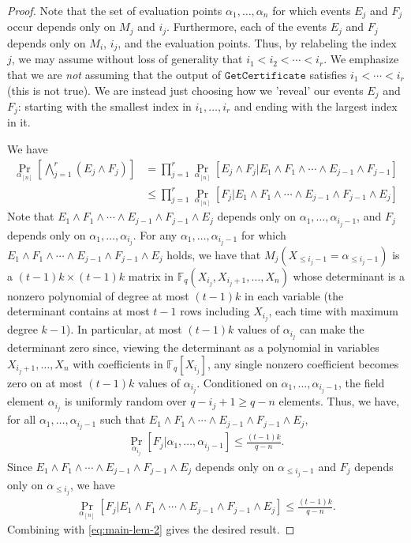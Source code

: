 \documentclass{article}[11pt]
\begin{document}
\begin{proof}
  Note that the set of evaluation points $\alpha_1,\dots,\alpha_n$ for which events $E_j$ and $F_j$ occur depends only on $M_j$ and $i_j$.
  Furthermore, each of the events $E_j$ and $F_j$ depends only on $M_i$, $i_j$, and the evaluation points.
  Thus, by relabeling the index $j$, we may assume without loss of generality that $i_1<i_2<\cdots<i_r$.
  We emphasize that we are \emph{not} assuming that the output of $\mathtt{GetCertificate}$ satisfies $i_1<\cdots<i_r$ (this is not true).
  We are instead just choosing how we 'reveal' our events $E_j$ and $F_j$: starting with the smallest index in $i_1, \ldots , i_r$ and ending with the largest index in it.

  We have
  \begin{align}
    \Pr_{\alpha_{[n]}}\left[\bigwedge_{j=1}^{r} (E_j\wedge F_j)\right]
    &=\prod_{j=1}^{r} \Pr_{\alpha_{[n]}}\left[E_j\wedge F_j|E_1\wedge F_1\wedge\cdots\wedge E_{j-1}\wedge F_{j-1}\right] \nonumber\\
    &\le\prod_{j=1}^{r} \Pr_{\alpha_{[n]}}\left[F_j|E_1\wedge F_1\wedge\cdots\wedge E_{j-1}\wedge F_{j-1}\wedge E_j\right] 
    \label{eq:main-lem-2}
  \end{align}
  Note that $E_1\wedge F_1\wedge \cdots \wedge E_{j-1}\wedge F_{j-1}\wedge E_j$ depends only on $\alpha_1,\dots,\alpha_{i_j-1}$, and $F_j$ depends only on $\alpha_1,\dots,\alpha_{i_j}$.
  For any $\alpha_1,\dots,\alpha_{i_j-1}$ for which $E_1\wedge F_1\wedge \cdots \wedge E_{j-1}\wedge F_{j-1}\wedge E_j$ holds, we have that $M_j(X_{\le i_j-1}= \alpha_{\le i_j-1})$ is a $(t-1)k\times (t-1)k$ matrix in $\mathbb{F}_q(X_{i_j},X_{i_j+1},\dots,X_n)$ whose determinant is a nonzero polynomial of degree at most $(t-1)k$ in each variable (the determinant contains at most $t-1$ rows including $X_{i_j}$, each time with maximum degree $k-1$). In particular, at most $(t-1)k$ values of $\alpha_{i_j}$ can make the determinant zero since, viewing the determinant as a polynomial in variables $X_{i_j+1},\dots,X_n$ with coefficients in $\mathbb{F}_q[X_{i_j}]$, any single nonzero coefficient becomes zero on at most $(t-1)k$ values of $\alpha_{i_j}$.
  Conditioned on $\alpha_1,\dots,\alpha_{i_j-1}$, the field element $\alpha_{i_j}$ is uniformly random over $q-i_j+1\ge q-n$ elements.
  Thus, we have, for all $\alpha_1,\dots,\alpha_{i_j-1}$ such that $E_1\wedge F_1\wedge \cdots \wedge E_{j-1}\wedge F_{j-1}\wedge E_j$,
  \begin{align}
    \Pr_{\alpha_{i_j}}\left[F_j|\alpha_1,\dots,\alpha_{i_j-1}\right]\le \frac{(t-1)k}{q-n}.
    \label{eq:product-3}
  \end{align}
  Since $E_1\wedge F_1\wedge \cdots \wedge E_{j-1}\wedge F_{j-1}\wedge E_j$ depends only on $\alpha_{\le i_j-1}$ and $F_j$ depends only on $\alpha_{\le i_j}$, we have
  \begin{align}
    \Pr_{\alpha_{[n]}}\left[F_j|E_1\wedge F_1\wedge\cdots\wedge E_{j-1}\wedge F_{j-1}\wedge E_j\right] \le \frac{(t-1)k}{q-n}.
    \label{}
  \end{align}
  Combining with \eqref{eq:main-lem-2} gives the desired result.
\end{proof}
\end{document}
